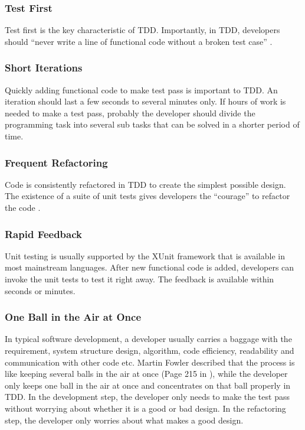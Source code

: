 \subsubsection{Test First}
Test first is the key characteristic of TDD. Importantly, in 
TDD, developers should ``never write a line of functional 
code without a broken test case'' \cite{Beck:01}. 

\subsubsection{Short Iterations}
Quickly adding functional code to make test pass is important
to TDD. An iteration should last a few seconds to 
several minutes only. If hours of work is needed to make a 
test pass, probably the developer should divide the programming 
task into several sub tasks that can be solved in a shorter
period of time. 

\subsubsection{Frequent Refactoring}
Code is consistently refactored in TDD to create the simplest
possible design. The existence of a suite of unit tests gives 
developers the ``courage'' to refactor the code \cite{Beck:03}. 

\subsubsection{Rapid Feedback}
Unit testing is usually supported by the XUnit\cite{XUnit}
framework that is available in most mainstream languages. 
After new functional code is added, developers can invoke
the unit tests to test it right away. The feedback is available
within seconds or minutes. 

\subsubsection{One Ball in the Air at Once}
In typical software development, a developer usually carries 
a baggage with the requirement, system structure design, algorithm, 
code efficiency, readability and communication with other code 
etc. Martin Fowler described that the process is like keeping 
several balls in the air at once (Page 215 in \cite{Beck:03}), 
while the developer only keeps one ball in the air at once and 
concentrates on that ball properly in TDD. In the development
step, the developer only needs to make the test pass 
without worrying about whether it is a good or bad design. In 
the refactoring step, the developer only worries about what 
makes a good design. 

